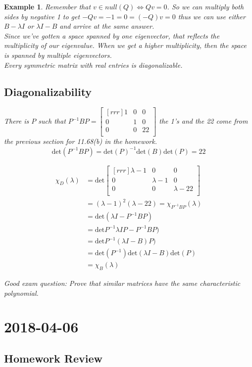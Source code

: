 \documentclass{report}
\newtheorem*{ex}{Example}
\newcommand{\mychapter}[2]{
	\setcounter{chapter}{#1}
	\setcounter{section}{0}
	\chapter*{#2}
	\addcontentsline{toc}{chapter}{#2}
}
\begin{document}
\begin{ex}
Remember that $v\in null(Q) \iff Qv=0$. So we can multiply both sides by negative 1 to get $-Qv=-1=0 = (-Q)v=0$ thus we can use either $B-\lambda I$ or $\lambda I - B$ and arrive at the same answer.\\
Since we've gotten a space spanned by one eigenvector, that reflects the multiplicity of our eigenvalue. When we get a higher multiplicity, then the space is spanned by multiple eigenvectors.\\
Every symmetric matrix with real entries is diagonalizable.

\section{Diagonalizability}
There is $P$ such that $P^{-1}BP=\begin{bmatrix}[rrr]1&0&0\\0&1&0\\0&0&22\\\end{bmatrix}$ the 1's and the 22 come from the previous section for 11.68(b) in the homework.
\[ \mathrm{det}(P^{-1}BP)=\mathrm{det}(P)^{-1}\mathrm{det}(B)\mathrm{det}(P)=22 \]

\begin{align*}
\chi_D(\lambda)&=\mathrm{det}\begin{bmatrix}[rrr]\lambda-1&0&0\\0&\lambda-1&0\\0&0&\lambda-22\\\end{bmatrix}\\
&=(\lambda-1)^2(\lambda-22)
=\chi_{P^{-1}BP}(\lambda)\\
&=\mathrm{det}(\lambda I-P^{-1}BP)\\
&=\mathrm{det}P^{-1}\lambda IP-P^{-1}BP)\\
&= \mathrm{det}P^{-1}(\lambda I-B)P)\\
&= \mathrm{det}(P^{-1})\mathrm{det}(\lambda I-B)\mathrm{det}(P)\\
&= \chi_B(\lambda)
\end{align*}

Good exam question: Prove that similar matrices have the same characteristic polynomial.
\end{ex}
\mychapter{37}{2018-04-06}
\section{Homework Review}
\end{document}
